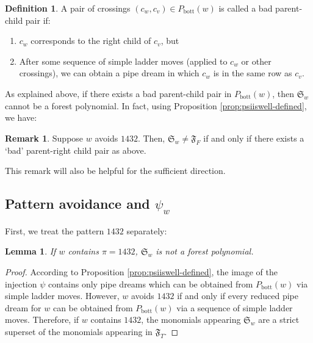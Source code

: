 \documentclass{article}
\newtheorem{lemma}[theorem]{Lemma}
\theoremstyle{definition} %
\newtheorem{remark}[theorem]{Remark}
\newtheorem{definition}[theorem]{Definition}
\begin{document}
\begin{definition}
    A pair of crossings $(c_w, c_v) \in P_{\text{bott}}(w)$ is called a bad parent-child pair if:
    
    \begin{enumerate}
        \item $c_w$ corresponds to the right child of $c_v$, but
        \item After some sequence of simple ladder moves (applied to $c_w$ or other crossings), we can obtain a pipe dream in which $c_w$ is in the same row as $c_v$. 
    \end{enumerate}
\end{definition}

As explained above, if there exists a bad parent-child pair in $P_{\text{bott}}(w)$, then $\mathfrak{S}_w$ cannot be a forest polynomial. In fact, using Proposition \ref{prop:psiiswell-defined}, we have:
\vspace{1em}

\begin{remark}\label{rmk:usefulremark}
    Suppose $w$ avoids $1432$. Then, $\mathfrak{S}_w \neq \mathfrak{F}_F$ if and only if there exists a `bad' parent-right child pair as above. 
\end{remark}

This remark will also be helpful for the sufficient direction. 

\subsection{Pattern avoidance and $\psi_w$}

First, we treat the pattern $1432$ separately:
\vspace{1em}

\begin{lemma}
    If $w$ contains $\pi = 1432$, $\mathfrak{S}_w$ is not a forest polynomial.
\end{lemma}

\begin{proof}
    According to Proposition \ref{prop:psiiswell-defined}, the image of the injection $\psi$ contains only pipe dreams which can be obtained from $P_{\text{bott}}(w)$ via simple ladder moves. However, $w$ avoids $1432$ if and only if every reduced pipe dream for $w$ can be obtained from $P_{\text{bott}}(w)$ via a sequence of simple ladder moves. Therefore, if $w$ contains $1432$, the monomials appearing $\mathfrak{S}_w$ are a strict superset of the monomials appearing in $\mathfrak{F}_T$. 
\end{proof}
\end{document}
